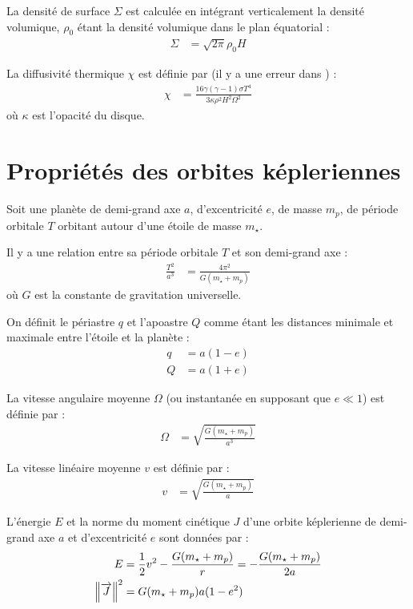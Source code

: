 La densité de surface $\Sigma$ est calculée en intégrant verticalement la densité volumique, $\rho_0$ étant la densité volumique dans le plan équatorial : 
\begin{align}
\Sigma &= \sqrt{2\pi}\rho_0 H
\end{align}

La diffusivité thermique $\chi$ est définie par (il y a une erreur dans \cite[eq. (33)]{paardekooper2011torque}) : 
\begin{align}
\chi &= \frac{16\gamma (\gamma - 1) \sigma T^4}{3\kappa\rho^2H^2\Omega^2}\label{eq:diffusivity}
\end{align}
où $\kappa$ est l'opacité du disque.

\section{Propriétés des orbites képleriennes}
Soit une planète de demi-grand axe $a$, d'excentricité $e$, de masse $m_p$, de période orbitale $T$ orbitant autour d'une étoile de masse $m_\star$. 

Il y a une relation entre sa période orbitale $T$ et son demi-grand axe :
\begin{align}
\frac{T^2}{a^3} &= \frac{4\pi^2}{G(m_\star + m_p)}
\end{align}
où $G$ est la constante de gravitation universelle.

On définit le périastre $q$ et l'apoastre $Q$ comme étant les distances minimale et maximale entre l'étoile et la planète : 
\begin{subequations}
\begin{align}
q &= a (1 - e)\\
Q &= a (1 + e)
\end{align}
\end{subequations}

La vitesse angulaire moyenne $\Omega$ (ou instantanée en supposant que $e\ll 1$) est définie par : 
\begin{align}
\Omega &= \sqrt{\frac{G(m_\star + m_p)}{a^3}}
\end{align}

La vitesse linéaire moyenne $v$ est définie par : 
\begin{align}
v &= \sqrt{\frac{G(m_\star + m_p)}{a}}
\end{align}

L'énergie $E$ et la norme du moment cinétique $J$ d'une orbite képlerienne de demi-grand axe $a$ et d'excentricité $e$ sont
données par :
\begin{align}
E &= \frac{1}{2}v^2 - \frac{G(m_\star + m_p)}{r} = -\frac{G(m_\star + m_p)}{2a}\\
\left\|{\overrightarrow{J}}\right\|^2 &= G(m_\star + m_p) a (1-e^2)
\end{align}

